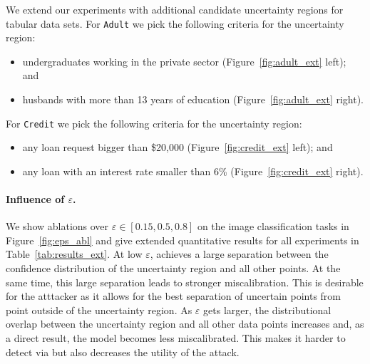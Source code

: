 We extend our experiments with additional candidate uncertainty regions for tabular data sets. For \texttt{Adult} we pick the following criteria for the uncertainty region:
\begin{itemize}[noitemsep]
    \item undergraduates working in the private sector (Figure~\ref{fig:adult_ext} left); and 
    \item husbands with more than 13 years of education (Figure~\ref{fig:adult_ext} right).
\end{itemize}
For \texttt{Credit} we pick the following criteria for the uncertainty region:
\begin{itemize}[noitemsep]
    \item any loan request bigger than \$20,000 (Figure~\ref{fig:credit_ext} left); and
    \item any loan with an interest rate smaller than 6\% (Figure~\ref{fig:credit_ext} right).
\end{itemize}

\paragraph{Influence of $\varepsilon$.} We show ablations over $\varepsilon \in [0.15,0.5,0.8]$ on the image classification tasks in Figure~\ref{fig:eps_abl} and give extended quantitative results for all experiments in Table~\ref{tab:results_ext}. At low $\varepsilon$, \attack achieves a large separation between the confidence distribution of the uncertainty region and all other points. At the same time, this large separation leads to stronger miscalibration. This is desirable for the atttacker as it allows for the best separation of uncertain points from point outside of the uncertainty region. As $\varepsilon$ gets larger, the distributional overlap between the uncertainty region and all other data points increases and, as a direct result, the model becomes less miscalibrated. This makes it harder to detect \attack via \name but also decreases the utility of the attack.

